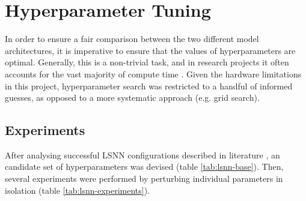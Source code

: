 \documentclass[../../report.tex]{subfiles}
\begin{document}
\section{Hyperparameter Tuning}

In order to ensure a fair comparison between the two different model
architectures, it is imperative to ensure that the values of hyperparameters are
optimal. Generally, this is a non-trivial task, and in research projects it
often accounts for the vast majority of compute time \cite{Strubell2019}. Given
the hardware limitations in this project, hyperparameter search was restricted
to a handful of informed guesses, as opposed to a more systematic approach (e.g.
grid search).

\subsection{Experiments}

After analysing successful LSNN configurations described in literature
\cite{Bellec2018LSNN, Bellec2020}, an candidate set of hyperparameters was
devised (table \ref{tab:lsnn-base}). Then, several experiments were performed by
perturbing individual parameters in isolation (table
\ref{tab:lsnn-experiments}).
\end{document}
